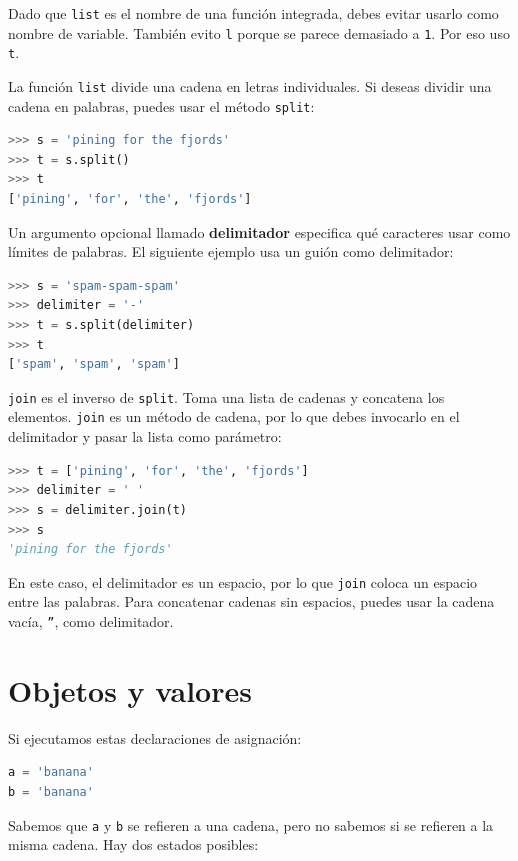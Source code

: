 Dado que \texttt{list} es el nombre de una función integrada, debes evitar usarlo como nombre de variable. También evito \texttt{l} porque se parece demasiado a \texttt{1}. Por eso uso \texttt{t}.

La función \texttt{list} divide una cadena en letras individuales. Si deseas dividir una cadena en palabras, puedes usar el método \texttt{split}:

\begin{lstlisting}[language=Python]
>>> s = 'pining for the fjords' 
>>> t = s.split() 
>>> t 
['pining', 'for', 'the', 'fjords']
\end{lstlisting}

Un argumento opcional llamado \textbf{delimitador} especifica qué caracteres usar como límites de palabras. El siguiente ejemplo usa un guión como delimitador:

\begin{lstlisting}[language=Python]
>>> s = 'spam-spam-spam' 
>>> delimiter = '-' 
>>> t = s.split(delimiter) 
>>> t 
['spam', 'spam', 'spam']
\end{lstlisting}

\texttt{join} es el inverso de \texttt{split}. Toma una lista de cadenas y concatena los elementos. \texttt{join} es un método de cadena, por lo que debes invocarlo en el delimitador y pasar la lista como parámetro:

\begin{lstlisting}[language=Python]
>>> t = ['pining', 'for', 'the', 'fjords'] 
>>> delimiter = ' ' 
>>> s = delimiter.join(t) 
>>> s 
'pining for the fjords'
\end{lstlisting}

En este caso, el delimitador es un espacio, por lo que \texttt{join} coloca un espacio entre las palabras. Para concatenar cadenas sin espacios, puedes usar la cadena vacía, \texttt{''}, como delimitador.

\section{Objetos y valores}

Si ejecutamos estas declaraciones de asignación:

\begin{lstlisting}[language=Python]
a = 'banana'
b = 'banana'
\end{lstlisting}

Sabemos que \texttt{a} y \texttt{b} se refieren a una cadena, pero no sabemos si se refieren a la misma cadena. Hay dos estados posibles:

